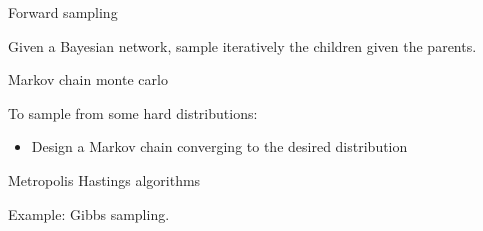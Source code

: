 \documentclass{beamer}
\begin{document}
    \begin{frame}{Forward sampling}

        Given a Bayesian network, sample iteratively the children given the parents.

    \end{frame}

    \begin{frame}{Markov chain monte carlo}

        To sample from some hard distributions:
        \begin{itemize}
            \item Design a Markov chain converging to the desired distribution
        \end{itemize}

        \begin{block}{Metropolis Hastings algorithms}
        \end{block}

        Example: Gibbs sampling.

    \end{frame}
\end{document}
